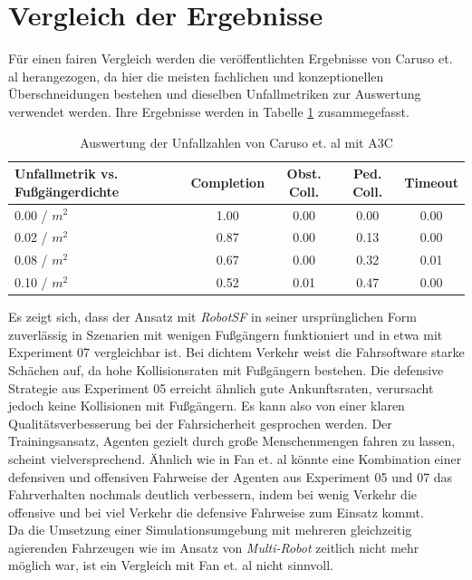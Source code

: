 \section{Vergleich der Ergebnisse}
Für einen fairen Vergleich werden die veröffentlichten Ergebnisse von Caruso et. al
\cite{machines11020268} herangezogen, da hier die meisten fachlichen und
konzeptionellen Überschneidungen bestehen und dieselben Unfallmetriken zur Auswertung
verwendet werden. Ihre Ergebnisse werden in Tabelle \ref{tab:EvalTriest}
zusammegefasst.\\

\begin{table}[h]
\centering
\begin{tabular}{ |p{3cm}||c|c|c|c| }
 \hline
 Unfallmetrik vs. Fußgängerdichte & Completion & Obst. Coll. & Ped. Coll. & Timeout \\
 \hline \hline
 0.00 / $m^2$ & 1.00 & 0.00 & 0.00 & 0.00 \\ \hline
 0.02 / $m^2$ & 0.87 & 0.00 & 0.13 & 0.00 \\ \hline
 0.08 / $m^2$ & 0.67 & 0.00 & 0.32 & 0.01 \\ \hline
 0.10 / $m^2$ & 0.52 & 0.01 & 0.47 & 0.00 \\ \hline
\end{tabular}
 \caption{Auswertung der Unfallzahlen von Caruso et. al \cite{machines11020268} mit A3C}
 \label{tab:EvalTriest}
\end{table}

Es zeigt sich, dass der Ansatz mit \emph{RobotSF} in seiner ursprünglichen Form zuverlässig
in Szenarien mit wenigen Fußgängern funktioniert und in etwa mit Experiment 07 vergleichbar
ist. Bei dichtem Verkehr weist die Fahrsoftware starke Schächen auf, da hohe Kollisionsraten
mit Fußgängern bestehen. Die defensive Strategie aus Experiment 05 erreicht ähnlich
gute Ankunftsraten, verursacht jedoch keine Kollisionen mit Fußgängern. Es kann also
von einer klaren Qualitätsverbesserung bei der Fahrsicherheit gesprochen werden.
Der Trainingsansatz, Agenten gezielt durch große Menschenmengen fahren zu lassen, scheint
vielversprechend. Ähnlich wie in Fan et. al \cite{fan2020distributed} könnte eine Kombination
einer defensiven und offensiven Fahrweise der Agenten aus Experiment 05 und 07 das Fahrverhalten
nochmals deutlich verbessern, indem bei wenig Verkehr die offensive und bei viel
Verkehr die defensive Fahrweise zum Einsatz kommt.\\

Da die Umsetzung einer Simulationsumgebung mit mehreren gleichzeitig agierenden Fahrzeugen
wie im Ansatz von \emph{Multi-Robot} zeitlich nicht mehr möglich war, ist ein Vergleich mit
Fan et. al \cite{fan2020distributed} nicht sinnvoll.
